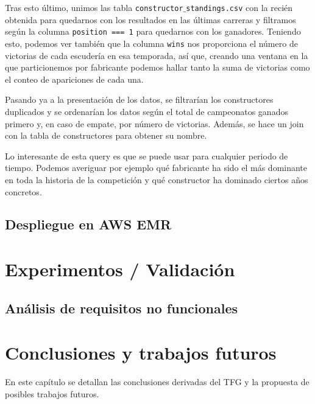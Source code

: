 \documentclass[12pt,twoside,titlepage]{report}
\begin{document}
Tras esto último, unimos las tabla \texttt{constructor$\_$standings.csv} con la recién obtenida para quedarnos con los resultados en las últimas carreras y filtramos según la columna \texttt{position === 1} para quedarnos con los ganadores. Teniendo esto, podemos ver también que la columna \texttt{wins} nos proporciona el número de victorias de cada escudería en esa temporada, así que, creando una ventana en la que particionemos por fabricante podemos hallar tanto la suma de victorias como el conteo de apariciones de cada una. 

Pasando ya a la presentación de los datos, se filtrarían los constructores duplicados y se ordenarían los datos según el total de campeonatos ganados primero y, en caso de empate, por número de victorias. Además, se hace un join con la tabla de constructores para obtener su nombre.

Lo interesante de esta query es que se puede usar para cualquier periodo de tiempo. Podemos averiguar por ejemplo qué fabricante ha sido el más dominante en toda la historia de la competición y qué constructor ha dominado ciertos años concretos.


\section{Despliegue en AWS EMR}



\chapter{Experimentos / Validación}
\label{sec:expVal}
\newpage





\section{Análisis de requisitos no funcionales}







\chapter{Conclusiones y trabajos futuros}
\newpage

En este capítulo se detallan las conclusiones derivadas del TFG y la propuesta de posibles trabajos futuros.
\end{document}
